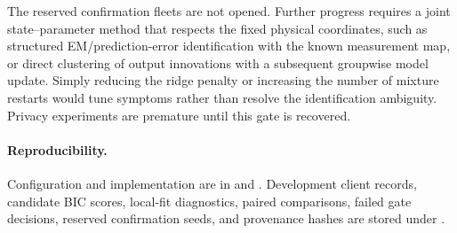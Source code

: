 The reserved confirmation fleets are not opened. Further progress requires a
joint state--parameter method that respects the fixed physical coordinates,
such as structured EM/prediction-error identification with the known
measurement map, or direct clustering of output innovations with a subsequent
groupwise model update. Simply reducing the ridge penalty or increasing the
number of mixture restarts would tune symptoms rather than resolve the
identification ambiguity. Privacy experiments are premature until this gate is
recovered.

\paragraph{Reproducibility.}
Configuration and implementation are in
 and
.
Development client records, candidate BIC scores, local-fit diagnostics,
paired comparisons, failed gate decisions, reserved confirmation seeds, and
provenance hashes are stored under .
